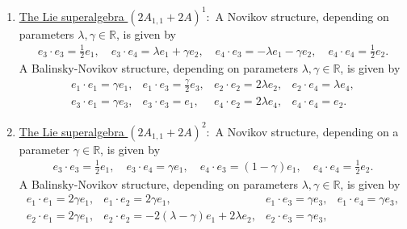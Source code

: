 \documentclass[12pt]{amsart}
\begin{document}
\begin{enumerate}
However, there is a Balinsky-Novikov structure, depending on parameters $\lambda, \gamma \in \mathbb R$, is given by given by 
 \[
 \begin{array}{lll}
e_1 \cdot e_1= (\gamma-1) e_1+\lambda e_2, & e_1\cdot e_2= \gamma e_2, & e_1\cdot e_3=\frac{1}{2} (1+\gamma)e_3, \\[2mm] e_1\cdot e_4= -\lambda e_3+\frac{1}{2}(\gamma-1)e_4,&
e_2\cdot e_1=(\gamma-1) e_2, & e_2\cdot e_4= (1-\gamma) e_3, \\[2mm]
e_3\cdot e_1= (\gamma-1) e_3, &  e_3\cdot e_4= \frac{1}{2} e_2,&
e_4\cdot e_1=-2 \lambda e_3+(\gamma-1)e_4, \\[2mm] 
e_4\cdot e_2=-2 \gamma e_3& e_4\cdot e_3=\frac{1}{2}e_2, & e_4\cdot e_4=-e_1.
 \end{array}
 \]
   \item \underline{The Lie superalgebra $(2A_{1,1}+2A)^1:$} A Novikov structure, depending on parameters $\lambda, \gamma \in \mathbb R$, is given by
    \[
\begin{array}{l}
e_3\cdot e_3= \frac{1}{2}e_1 , \quad e_3\cdot e_4= \lambda e_1 +\gamma e_2, \quad e_4\cdot e_3= - \lambda e_1 -\gamma e_2 ,  \quad e_4\cdot e_4= \frac{1}{2} e_2.
\end{array}
 \]
A Balinsky-Novikov structure, depending on parameters $\lambda, \gamma \in \mathbb R$, is given by 
 \[
 \begin{array}{llll}
e_1 \cdot e_1= \gamma e_1, & e_1\cdot e_3= \frac{\gamma}{2} e_3, & e_2\cdot e_2=2 \lambda e_2, & e_2\cdot e_4= \lambda e_4,\\[2mm]
e_3\cdot e_1=\gamma e_3, & e_3\cdot e_3=  e_1, & e_4\cdot e_2= 2 \lambda  e_4, &  e_4\cdot e_4= e_2.
 \end{array}
 \]
  \item \underline{The Lie superalgebra $(2A_{1,1}+2A)^2:$} A Novikov structure, depending on a parameter $\gamma \in \mathbb R$, is given by 
    \[
\begin{array}{l}
e_3\cdot e_3= \frac{1}{2}e_1 , \quad e_3\cdot e_4= \gamma e_1, \quad e_4\cdot e_3= (1- \gamma) e_1 ,  \quad e_4\cdot e_4= \frac{1}{2} e_2.
\end{array}
 \]
 A Balinsky-Novikov structure, depending on parameters $\lambda, \gamma \in \mathbb R$, is given by
 \[
 \begin{array}{llll}
e_1 \cdot e_1= 2\gamma e_1, & e_1\cdot e_2= 2 \gamma e_1, & e_1\cdot e_3= \gamma e_3, &e_1\cdot e_4=\gamma e_3, \\[2mm]
e_2\cdot e_1= 2 \gamma e_1,& 
e_2\cdot e_2=-2(\lambda-\gamma) e_1+2 \lambda e_2, & e_2\cdot e_3=  \gamma e_3, & 

\end{array}\]
\end{enumerate}
\end{document}
